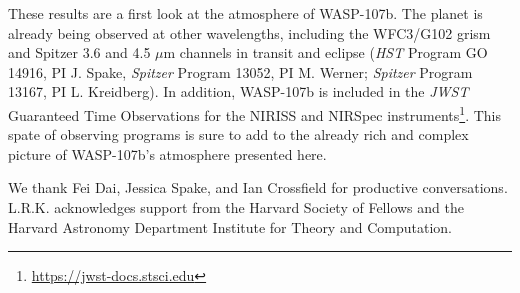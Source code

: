 \documentclass[twocolumn]{aastex61}
\begin{document}
\begin{itemize}
\end{itemize}

These results are a first look at the atmosphere of WASP-107b. The planet is already being observed at other wavelengths, including the WFC3/G102 grism and Spitzer 3.6 and 4.5 $\mu$m channels in transit and eclipse (\emph{HST} Program GO 14916, PI J. Spake, \emph{Spitzer} Program 13052, PI M. Werner; \emph{Spitzer} Program 13167, PI L. Kreidberg).  In addition, WASP-107b is included in the \emph{JWST} Guaranteed Time Observations for the NIRISS and NIRSpec instruments\footnote{\url{https://jwst-docs.stsci.edu}}.  This spate of observing programs is sure to add to the already rich and complex picture of WASP-107b's atmosphere presented here. 


\acknowledgments
We thank Fei Dai, Jessica Spake, and Ian Crossfield for productive conversations. L.R.K. acknowledges support from the Harvard Society of Fellows and the Harvard Astronomy Department Institute for Theory and Computation.



\end{document}

